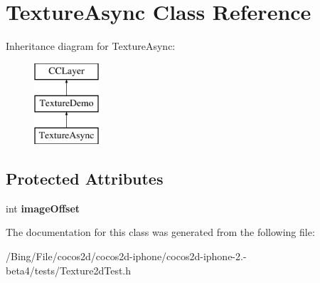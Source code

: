 \hypertarget{interface_texture_async}{\section{Texture\-Async Class Reference}
\label{interface_texture_async}
}
Inheritance diagram for Texture\-Async\-:\begin{figure}[H]
\begin{center}
\leavevmode
\includegraphics[height=3.000000cm]{interface_texture_async}
\end{center}
\end{figure}
\subsection*{Protected Attributes}
\begin{DoxyCompactItemize}
\item 
\hypertarget{interface_texture_async_afc105d31a92038b76b0cf063a231ae4e}{int {\bfseries image\-Offset}}\label{interface_texture_async_afc105d31a92038b76b0cf063a231ae4e}

\end{DoxyCompactItemize}


The documentation for this class was generated from the following file\-:\begin{DoxyCompactItemize}
\item 
/\-Bing/\-File/cocos2d/cocos2d-\/iphone/cocos2d-\/iphone-\/2.-\/beta4/tests/Texture2d\-Test.\-h\end{DoxyCompactItemize}
